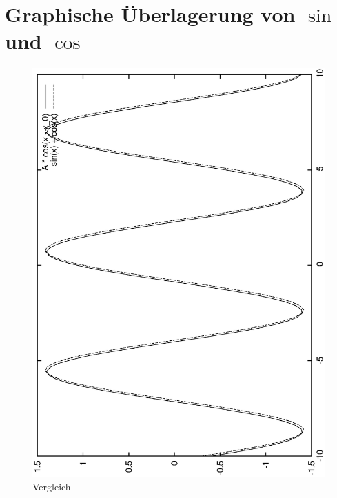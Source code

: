 \section{Graphische Überlagerung von $\sin$ und $\cos$}



\begin{figure}[h!]
  \begin{center}
    \includegraphics{grafiken/vergleich}
  \end{center}
  \caption{Vergleich}
  \label{fig:vergleich}
\end{figure}

